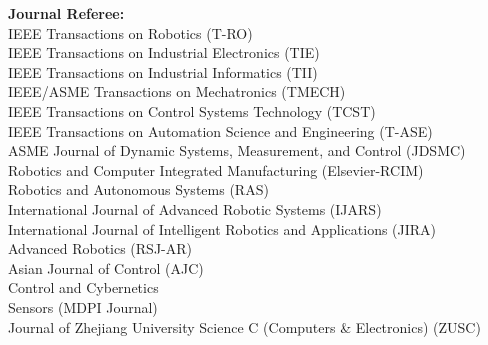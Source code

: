 \documentclass[UTF8,fontset=none]{res}
\begin{document}
\begin{resume}
    \textbf{Journal Referee:}\\
    IEEE Transactions on Robotics (T-RO)\\
    IEEE Transactions on Industrial Electronics (TIE)\\
    IEEE Transactions on Industrial Informatics (TII)\\
    IEEE/ASME Transactions on Mechatronics (TMECH)\\
    IEEE Transactions on Control Systems Technology (TCST)\\
    IEEE Transactions on Automation Science and Engineering (T-ASE)\\
    ASME Journal of Dynamic Systems, Measurement, and Control (JDSMC)\\
    Robotics and Computer Integrated Manufacturing (Elsevier-RCIM)\\
    Robotics and Autonomous Systems (RAS)\\
    International Journal of Advanced Robotic Systems (IJARS)\\
	International Journal of Intelligent Robotics and Applications (JIRA)\\
    Advanced Robotics (RSJ-AR)\\
    Asian Journal of Control (AJC)\\
    Control and Cybernetics\\
    Sensors (MDPI Journal)\\
    Journal of Zhejiang University Science C (Computers \& Electronics) (ZUSC)



\end{resume}
\end{document}
